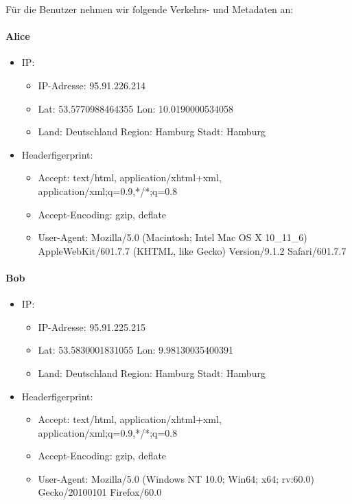 \documentclass[
    fontsize=12pt,
    headings=small,
    parskip=half,           %
    bibliography=totoc,
    numbers=noenddot,       %
    open=any,               %
    ]{scrreprt}
\begin{document}
Für die Benutzer nehmen wir folgende Verkehrs- und Metadaten an: 
\paragraph{Alice}
\begin{itemize}
  \item IP: 
  \begin{itemize}
  \item IP-Adresse: 95.91.226.214
  \item Lat: 53.5770988464355 Lon: 10.0190000534058
  \item Land: Deutschland Region: Hamburg Stadt: Hamburg
  \end{itemize}
  \item Headerfigerprint:  
  \begin{itemize}
  \item Accept: text/html, application/xhtml+xml, application/xml;q=0.9,*/*;q=0.8
  \item Accept-Encoding: gzip, deflate
  \item User-Agent: Mozilla/5.0 (Macintosh; Intel Mac OS X 10\_11\_6) AppleWebKit/601.7.7 (KHTML, like Gecko) Version/9.1.2 Safari/601.7.7
  \end{itemize}
\end{itemize}

\paragraph{Bob}
\begin{itemize}
  \item IP: 
  \begin{itemize}
  \item IP-Adresse: 95.91.225.215
  \item Lat: 53.5830001831055 Lon: 9.98130035400391
  \item Land: Deutschland Region: Hamburg Stadt: Hamburg
  \end{itemize}
  \item Headerfigerprint:  
  \begin{itemize}
  \item Accept: text/html, application/xhtml+xml, application/xml;q=0.9,*/*;q=0.8
  \item Accept-Encoding: gzip, deflate
  \item User-Agent: Mozilla/5.0 (Windows NT 10.0; Win64; x64; rv:60.0) Gecko/20100101 Firefox/60.0
  \end{itemize}
\end{itemize}
\end{document}
